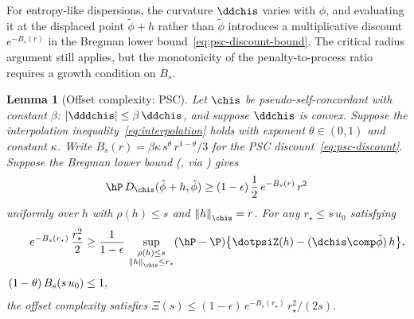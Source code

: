\documentclass{article}
\newtheorem{lemma}[theorem]{Lemma}
\begin{document}
For entropy-like dispersions,
the curvature $\ddchis$ varies with $\phi$,
and evaluating it at the displaced point
$\tilde\phi + h$ rather than $\tilde\phi$
introduces a multiplicative discount $e^{-B_s(r)}$
in the Bregman lower bound~\eqref{eq:psc-discount-bound}.
The critical radius argument still applies,
but the monotonicity of the penalty-to-process ratio
requires a growth condition on $B_s$.

\begin{lemma}[Offset complexity: PSC]
\label{lem:xi-psc}
Let $\chis$ be pseudo-self-concordant
with constant $\beta$:
$|\dddchis| \le \beta\, \ddchis$,
and suppose $\ddchis$ is convex.
Suppose the interpolation inequality~\eqref{eq:interpolation}
holds with exponent $\theta \in (0,1)$ and constant $\kappa$.
Write $B_s(r) = \beta\kappa\, s^\theta\, r^{1-\theta}/3$
for the PSC discount~\eqref{eq:psc-discount}.
Suppose the Bregman lower bound
(,
via )
gives
\begin{equation}
\label{eq:bregman-shell-psc}
\hP\, D_{\chis}(\tilde\phi + h, \tilde\phi)
  \ge (1-\epsilon)\, \frac{1}{2}\, e^{-B_s(r)}\, r^2
\end{equation}
uniformly over $h$
with $\rho(h) \le s$ and $\norm{h}_{\chis} = r$.
For any $r_\star \le s\, u_0$ satisfying
\begin{equation}
\label{eq:critical-psc}
\begin{aligned}
e^{-B_s(r_\star)}\, \frac{r_\star^2}{2}
  &\ge \frac{1}{1-\epsilon}\,
  \sup_{\substack{\rho(h) \le s \\
      \norm{h}_{\chis} \le r_\star}}
    (\hP - \P)\qty{\dotpsiZ(h) - (\dchis \comp \tilde\phi)\,h}, \\[4pt]
(1-\theta)\, B_s(s\, u_0) &\le 1,
\end{aligned}
\end{equation}
the offset complexity satisfies
$\Xi(s) \le (1-\epsilon)\, e^{-B_s(r_\star)}\, r_\star^2/(2s)$.
\end{lemma}
\end{document}
